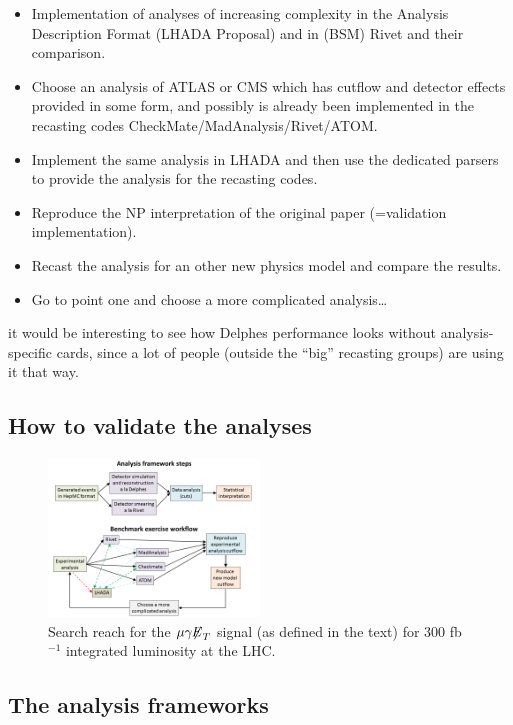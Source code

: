 \documentclass[11pt]{cernrep}
\begin{document}
\begin{itemize}
\item Implementation of analyses of increasing complexity in the Analysis Description Format (LHADA Proposal) and in (BSM) Rivet and their comparison.
\item Choose an analysis of ATLAS or CMS which has cutflow and detector effects provided in some form, and possibly is already been implemented in the recasting codes CheckMate/MadAnalysis/Rivet/ATOM.
\item Implement the same analysis in LHADA and then use the dedicated parsers to provide the analysis for the recasting codes.
\item Reproduce the NP interpretation of the original paper (=validation implementation).
\item Recast the analysis for an other new physics model and compare the results.
\item Go to point one and choose a more complicated analysis…
\end{itemize}
it would be interesting to see how Delphes performance looks without analysis-specific cards, since a lot of people (outside the “big” recasting groups) are using it that way.

\subsection{How to validate the analyses}
\begin{figure}
\begin{center}
\includegraphics[width=0.5\textwidth]{figures/lhada_benchmarking_excersise.png}
 \caption{Search reach for the $\mu \gamma {\not\!\!E}_{T}$ signal
(as defined in the
   text) for
   300 fb$^{-1}$ integrated luminosity  at the LHC.
}
\label{search}
\end{center}
\end{figure}


\subsection{The analysis frameworks}
\end{document}
